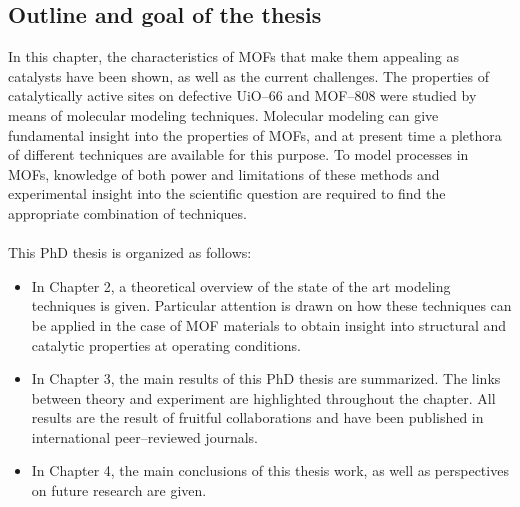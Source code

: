 \subsection*{Outline and goal of the thesis}
In this chapter, the characteristics of MOFs that make them appealing as catalysts have been shown, as well as the current challenges. The properties of catalytically active sites on defective UiO--66 and MOF--808 were studied by means of molecular modeling techniques. Molecular modeling can give fundamental insight into the properties of MOFs, and at present time a plethora of different techniques are available for this purpose. To model processes in MOFs, knowledge of both power and limitations of these methods and experimental insight into the scientific question are required to find the appropriate combination of techniques.\\\\
This PhD thesis is organized as follows:
\begin{itemize}
\item In Chapter 2, a theoretical overview of the state of the art modeling techniques is given. Particular attention is drawn on how these techniques can be applied in the case of MOF materials to obtain insight into structural and catalytic properties at operating conditions.
\item In Chapter 3, the main results of this PhD thesis are summarized. The links between theory and experiment are highlighted throughout the chapter. All results are the result of fruitful collaborations and have been published in international peer--reviewed journals. 
\item In Chapter 4, the main conclusions of this thesis work, as well as perspectives on future research are given.
\end{itemize}







